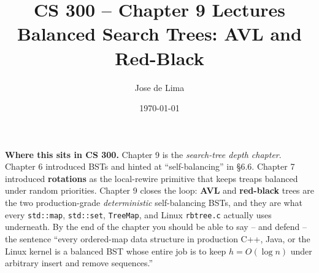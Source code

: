 \documentclass[11pt]{article}
\title{CS 300 -- Chapter 9 Lectures\\\large Balanced Search Trees: AVL and Red-Black}
\author{Jose de Lima}
\date{\today}
\begin{document}
\maketitle

\begin{ideabox}
\textbf{Where this sits in CS 300.} Chapter 9 is the
\emph{search-tree depth chapter}. Chapter 6 introduced BSTs and
hinted at ``self-balancing'' in \S6.6. Chapter 7 introduced
\textbf{rotations} as the local-rewire primitive that keeps treaps
balanced under random priorities. Chapter 9 closes the loop:
\textbf{AVL} and \textbf{red-black} trees are the two production-grade
\emph{deterministic} self-balancing BSTs, and they are what every
\texttt{std::map}, \texttt{std::set}, \texttt{TreeMap}, and Linux
\texttt{rbtree.c} actually uses underneath. By the end of the chapter
you should be able to say -- and defend -- the sentence ``every
ordered-map data structure in production C++, Java, or the Linux
kernel is a balanced BST whose entire job is to keep $h = O(\log n)$
under arbitrary insert and remove sequences.''


\end{ideabox}
\end{document}
